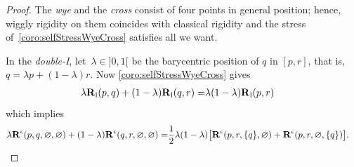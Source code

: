 \documentclass{amsart}
\theoremstyle{definition}
\renewcommand{\b}[1]{{\boldsymbol{#1}}} %
\newcommand{\Rvector}{\b{\rm R}} %
\newcommand{\lon}{\operatorname{l}} %
\newcommand{\Rlong}{\Rvector_{\lon}} %
\newcommand{\Reps}{\Rvector^\epsilon} %
\begin{document}
\begin{proof}
The \emph{wye} and the \emph{cross} consist of four points in general position; hence, wiggly rigidity on them coincides with classical rigidity and the stress of~\cref{coro:selfStressWyeCross} satisfies all we want.

\medskip
In the \emph{double-I}, let~$\lambda \in {]0,1[}$ be the barycentric position of $q$ in $[p,r]$, that is,~$q = \lambda p + (1-\lambda) r$. Now \cref{coro:selfStressWyeCross} gives
\begin{align*}
  \lambda\Rlong(p, q) + (1-\lambda)\Rlong(q, r) 
=& \lambda(1-\lambda)\Rlong(p, r)
\end{align*}
which implies
\begin{align*}
 \lambda\Reps(p, q, \varnothing, \varnothing) + (1-\lambda)\Reps(q, r, \varnothing, \varnothing) 
=& \frac12 {\lambda(1-\lambda)} \bigl[ \Reps(p, r, \{q\}, \varnothing) + \Reps(p, r, \varnothing, \{q\}) \bigr].
\end{align*}


\end{proof}
\end{document}
